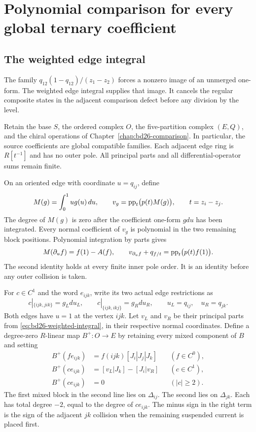 \chapter{Polynomial comparison for every global ternary coefficient}
\label{chap:bd26-polynomial-full}

\section{The weighted edge integral}

The family $q_{12}(1-q_{12})/(z_1-z_2)$ forces a nonzero image of an unmerged one-form.
The weighted edge integral supplies that image.
It cancels the regular composite states in the adjacent comparison defect before any division by the level.

Retain the base $S$, the ordered complex $O$, the five-partition complex $(E,Q)$, and the chiral operations of Chapter~\ref{chap:bd26-comparison}.
In particular, the source coefficients are global compatible families.
Each adjacent edge ring is $R[t^{-1}]$ and has no outer pole.
All principal parts and all differential-operator sums remain finite.

On an oriented edge with coordinate $u=q_{ij}$, define
\begin{equation}\label{eq:bd26-weighted-integral}
 M(g)=\int_0^1u g(u)\,du,
 \qquad v_g=\operatorname{pp}_t\bigl(p(t)M(g)\bigr),
 \qquad t=z_i-z_j.
\end{equation}
The degree of $M(g)$ is zero after the coefficient one-form $gdu$ has been integrated.
Every normal coefficient of $v_g$ is polynomial in the two remaining block positions.
Polynomial integration by parts gives
\begin{equation}\label{eq:bd26-weighted-endpoint}
 M(\partial_uf)=f(1)-A(f),\qquad
 v_{\partial_uf}+q_{f/t}=\operatorname{pp}_t\bigl(p(t)f(1)\bigr).
\end{equation}
The second identity holds at every finite inner pole order.
It is an identity before any outer collision is taken.

For $c\in C^1$ and the word $e_{ijk}$, write its two actual edge restrictions as
\[
 c|_{\{ijk,jik\}}=g_Ldu_L,
 \qquad c|_{\{ijk,ikj\}}=g_Rdu_R,
 \qquad u_L=q_{ij},\quad u_R=q_{jk}.
\]
Both edges have $u=1$ at the vertex $ijk$.
Let $v_L$ and $v_R$ be their principal parts from \eqref{eq:bd26-weighted-integral}, in their respective normal coordinates.
Define a degree-zero $R$-linear map $B^+:O\to E$ by retaining every mixed component of $B$ and setting
\begin{equation}\label{eq:bd26-positive-leading}
 \begin{aligned}
 B^+(fe_{ijk})&=f(ijk)[J_i|J_j|J_k] && (f\in C^0),\\
 B^+(ce_{ijk})&=[v_L|J_k]-[J_i|v_R] && (c\in C^1),\\
 B^+(ce_{ijk})&=0 && (|c|\geq2).
 \end{aligned}
\end{equation}
The first mixed block in the second line lies on $\Delta_{ij}$.
The second lies on $\Delta_{jk}$.
Each has total degree $-2$, equal to the degree of $ce_{ijk}$.
The minus sign in the right term is the sign of the adjacent $jk$ collision when the remaining suspended current is placed first.

